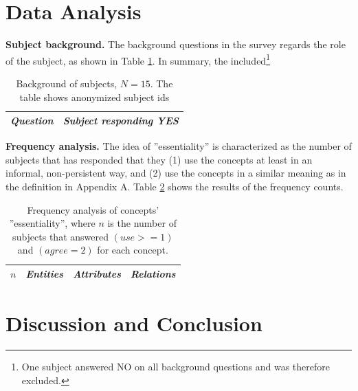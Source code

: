 \documentclass[a4paper]{llncs}
\begin{document}
\section{Data Analysis}

\textbf{Subject background.} The background questions in the survey regards the role of the subject, as shown in Table \ref{table:background}. In summary, the included\footnote{One subject answered NO on all background questions and was therefore excluded.} 
\begin{table}[H]
\centering
\fontsize{8}{9}\selectfont
\caption{Background of subjects, $N = 15$. The table shows anonymized subject ids}
\label{table:background}
\begin{tabular}{p{}| p{}}
\textit{Question} & \textit{Subject responding YES}  \\ \hline


 \end{tabular}
\end{table}

\textbf{Frequency analysis.} The idea of ''essentiality'' is characterized as the number of subjects that has responded that they (1) use the concepts at least in an informal, non-persistent way, and (2) use the concepts in a similar meaning as in the definition in Appendix A. Table \ref{table:frequency} shows the results of the frequency counts.  

%
\begingroup
\setlength{\tabcolsep}{4pt} %
\renewcommand{\arraystretch}{1.5} %
\begin{table}[H]
\centering
\fontsize{7}{8}\selectfont
\caption{Frequency analysis of concepts' ''essentiality'', where $n$ is the number of subjects that answered $(use >= 1)$ and $(agree = 2)$ for each concept.}
\label{table:frequency}
\begin{tabular}{l | p{} | p{} | p{}}
\textit{$n$} & \textit{Entities} & \textit{Attributes} & \textit{Relations} \\ \hline

 \end{tabular}
\end{table}
\endgroup

\section{Discussion and Conclusion}\label{section:discussion}
\end{document}
